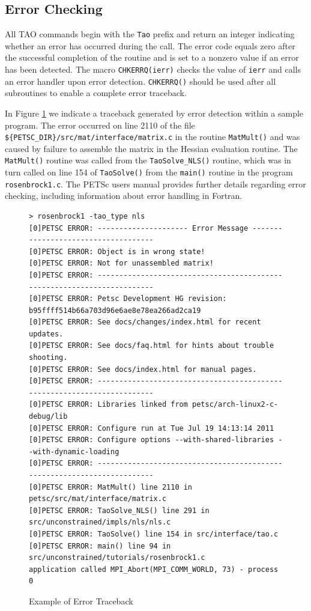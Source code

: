 \documentclass[]{book}
\begin{document}
\subsection*{Error Checking}

All TAO commands begin with the \texttt{Tao} prefix and return an
integer indicating whether an error has occurred during the call.  The
error code equals zero after the successful completion of the routine
and is set to a nonzero value if an error has been detected.  The
macro \texttt{CHKERRQ(ierr)} checks the value of \texttt{ierr} and calls an
error handler upon error detection.  \texttt{CHKERRQ()} should be used after
all subroutines to enable a complete error traceback.

In Figure \ref{fig_traceback} we indicate a traceback generated by
error detection within a sample program. The error occurred on line
2110 of the file \texttt{\$\{PETSC\_DIR\}/src/mat/inter\-face/mat\-rix.c} in the
routine \texttt{MatMult()} and was caused by failure to assemble the 
matrix in the Hessian evaluation routine.
The \texttt{MatMult()} routine was called from
the \texttt{TaoSolve\_NLS()} routine, which was in turn called on line 
154 of \texttt{TaoSolve()} from the \texttt{main()} routine 
in the program \texttt{rosenbrock1.c}.  The PETSc users
manual \cite{petsc-user-ref} provides further details
regarding error checking, including
information about error handling in Fortran.

\begin{figure}[htb]
{\footnotesize
\begin{verbatim}
> rosenbrock1 -tao_type nls
[0]PETSC ERROR: --------------------- Error Message ------------------------------------
[0]PETSC ERROR: Object is in wrong state!
[0]PETSC ERROR: Not for unassembled matrix!
[0]PETSC ERROR: ------------------------------------------------------------------------
[0]PETSC ERROR: Petsc Development HG revision: b95ffff514b66a703d96e6ae8e78ea266ad2ca19
[0]PETSC ERROR: See docs/changes/index.html for recent updates.
[0]PETSC ERROR: See docs/faq.html for hints about trouble shooting.
[0]PETSC ERROR: See docs/index.html for manual pages.
[0]PETSC ERROR: ------------------------------------------------------------------------
[0]PETSC ERROR: Libraries linked from petsc/arch-linux2-c-debug/lib
[0]PETSC ERROR: Configure run at Tue Jul 19 14:13:14 2011
[0]PETSC ERROR: Configure options --with-shared-libraries --with-dynamic-loading
[0]PETSC ERROR: ------------------------------------------------------------------------
[0]PETSC ERROR: MatMult() line 2110 in petsc/src/mat/interface/matrix.c
[0]PETSC ERROR: TaoSolve_NLS() line 291 in src/unconstrained/impls/nls/nls.c
[0]PETSC ERROR: TaoSolve() line 154 in src/interface/tao.c
[0]PETSC ERROR: main() line 94 in src/unconstrained/tutorials/rosenbrock1.c
application called MPI_Abort(MPI_COMM_WORLD, 73) - process 0
\end{verbatim}
}
\caption{Example of Error Traceback}
\label{fig_traceback}
\end{figure}
\end{document}
